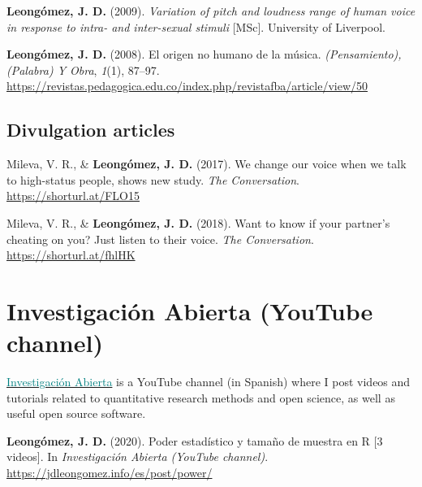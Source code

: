 \documentclass[11pt, a4paper]{awesome-cv}
\begin{document}
\leavevmode\hypertarget{ref-Leongomez2009}{}%
\textbf{Leongómez, J. D.} (2009). \emph{Variation of pitch and loudness range of human voice in response to intra- and inter-sexual stimuli} {[}MSc{]}. University of Liverpool.

\leavevmode\hypertarget{ref-Leongomez2008}{}%
\textbf{Leongómez, J. D.} (2008). El origen no humano de la música. \emph{(Pensamiento), (Palabra) Y Obra}, \emph{1}(1), 87--97. \url{https://revistas.pedagogica.edu.co/index.php/revistafba/article/view/50}

\endgroup

\hypertarget{divulgation-articles}{%
\subsection{Divulgation articles}\label{divulgation-articles}}

\begingroup
\setlength{\parindent}{-0.5in}
\setlength{\leftskip}{0.5in}

\hypertarget{refs_divulgation}{}
\leavevmode\hypertarget{ref-Mileva2017}{}%
Mileva, V. R., \& \textbf{Leongómez, J. D.} (2017). We change our voice when we talk to high-status people, shows new study. \emph{The Conversation}. \url{https://shorturl.at/FLO15}

\leavevmode\hypertarget{ref-Mileva2018}{}%
Mileva, V. R., \& \textbf{Leongómez, J. D.} (2018). Want to know if your partner's cheating on you? Just listen to their voice. \emph{The Conversation}. \url{https://shorturl.at/fhlHK}

\endgroup

\hypertarget{investigaciuxf3n-abierta-youtube-channel}{%
\section{Investigación Abierta (YouTube channel)}\label{investigaciuxf3n-abierta-youtube-channel}}

\href{https://www.youtube.com/user/juanleongomez/featured}{\textcolor{teal}{Investigación Abierta}} is a YouTube channel (in Spanish) where I post videos and tutorials related to quantitative research methods and open science, as well as useful open source software.

\begingroup
\setlength{\parindent}{-0.5in}
\setlength{\leftskip}{0.5in}

\hypertarget{refs_IA}{}
\leavevmode\hypertarget{ref-leongomezPower2020}{}%
\textbf{Leongómez, J. D.} (2020). Poder estadístico y tamaño de muestra en R {[}3 videos{]}. In \emph{Investigación Abierta (YouTube channel)}. \url{https://jdleongomez.info/es/post/power/}
\end{document}
